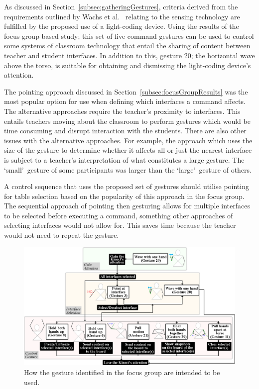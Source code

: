 \documentclass[link]{IWCOMP}
\begin{document}
As discussed in Section~\ref{subsec:gatheringGestures}, criteria derived from the requirements outlined by Wachs et al.~\citeyearpar{Wachs2011} relating to the sensing technology are fulfilled by the proposed use of a light-coding device.
Using the results of the focus group based study; this set of five command gestures can be used to control some systems of classroom technology that entail the sharing of content between teacher and student interfaces.
In addition to this, gesture 20; the horizontal wave above the torso, is suitable for obtaining and dismissing the light-coding device's attention.

The pointing approach discussed in Section~\ref{subsec:focusGroupResults} was the most popular option for use when defining which interfaces a command affects.
The alternative approaches require the teacher's proximity to interfaces.
This entails teachers moving about the classroom to perform gestures which would be time consuming and disrupt interaction with the students.
There are also other issues with the alternative approaches.
For example, the approach which uses the size of the gesture to determine whether it affects all or just the nearest interface is subject to a teacher's interpretation of what constitutes a large gesture.
The \lq small\rq\ gesture of some participants was larger than the \lq large\rq\ gesture of others.

A control sequence that uses the proposed set of gestures should utilise pointing for table selection based on the popularity of this approach in the focus group.
The sequential approach of pointing then gesturing allows for multiple interfaces to be selected before executing a command, something other approaches of selecting interfaces would not allow for.
This saves time because the teacher would not need to repeat the gesture.

\begin{figure}[t]
   \centering
   \includegraphics[width=1\textwidth]{figures/control_flow.png}
   \caption{How the gesture identified in the focus group are intended to be used.}
   \label{fig:flow}
\end{figure}
\end{document}
